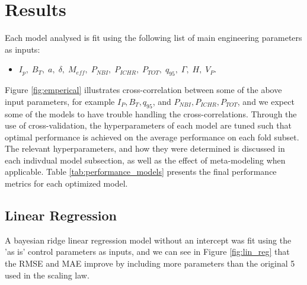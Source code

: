 \documentclass[a4paper, twoside, final, 12pt]{article}
\begin{document}
\section{Results}{\label{sec:results_1}
Each model analysed is fit using the following list of main engineering parameters as inputs:
\begin{itemize}
        \item $I_p, \; B_T,\; a, \; \delta, \; M_{eff},\; P_{NBI},\; P_{ICHR},\; P_{TOT}, \; q_{95},\; \Gamma, \; H,\; V_P$.
\end{itemize}
Figure \ref{fig:emperical} illustrates cross-correlation between some of the above input parameters, for example $I_P, B_T, q_{95}$, and $P_{NBI}, P_{ICHR}, P_{TOT}$, and we expect some of the models to have trouble handling the cross-correlations. 
Through the use of cross-validation, the hyperparameters of each model are tuned such that optimal performance is achieved on the average performance on each fold subset.
The relevant hyperparameters, and how they were determined is discussed in each indivdual model subsection, as well as the effect of meta-modeling when applicable.
Table \ref{tab:performance_models} presents the final performance metrics for each optimized model. 

\subsection{Linear Regression}
A bayesian ridge linear regression model without an intercept was fit using the 'as is' control parameters as inputs, and we can see in Figure \ref{fig:lin_reg} that the RMSE and MAE improve by including more parameters than the original 5 used in the scaling law.

}
\end{document}
